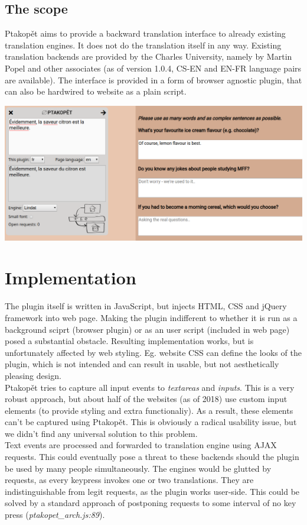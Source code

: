 \documentclass[a4paper]{article}
\begin{document}
\subsection{The scope}
Ptakopět aims to provide a backward translation interface to already existing translation engines. It does not do the translation itself in any way. Existing translation backends are provided by the Charles University, namely by Martin Popel and other associates (as of version 1.0.4, CS-EN and EN-FR language pairs are available). The interface is provided in a form of browser agnostic plugin, that can also be hardwired to website as a plain script.

\vspace{1cm}
\begin{center}
\includegraphics[width=\textwidth]{screenshot_3}
\end{center}

\section{Implementation}
The plugin itself is written in JavaScript, but injects HTML, CSS and jQuery framework into web page. Making the plugin indifferent to whether it is run as a background sciprt (browser plugin) or as an user script (included in web page) posed a substantial obstacle. Resulting implementation works, but is unfortunately affected by web styling. Eg.  website CSS can define the looks of the plugin, which is not intended and can result in usable, but not aesthetically pleasing design. \\
Ptakopět tries to capture all input events to \textit{textareas} and \textit{inputs}. This is a very robust approach, but about half of the websites (as of 2018) use custom input elements (to provide styling and extra functionaliy). As a result, these elements can't be captured using Ptakopět. This is obviously a radical usability issue, but we didn't find any universal solution to this problem. \\
Text events are processed and forwarded to translation engine using AJAX requests. This could eventually pose a threat to these backends should the plugin be used by many people simultaneously. The engines would be glutted by requests, as every keypress invokes one or two translations. They are indistinguishable from legit requests, as the plugin works user-side. This could be solved by a standard approach of postponing requests to some interval of no key press (\textit{ptakopet\_arch.js:89}).
\end{document}
